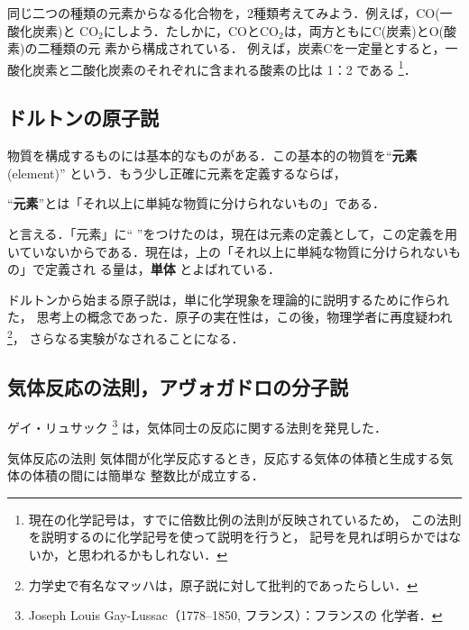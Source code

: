             同じ二つの種類の元素からなる化合物を，2種類考えてみよう．例えば，CO(一酸化炭素)と
            CO${}_{2}$にしよう．たしかに，COとCO${}_{2}$は，両方ともにC(炭素)とO(酸素)の二種類の元
            素から構成されている．
            例えば，炭素Cを一定量とすると，一酸化炭素と二酸化炭素のそれぞれに含まれる酸素の比は 1：2 である
                \footnote{
                    現在の化学記号は，すでに倍数比例の法則が反映されているため，
                    この法則を説明するのに化学記号を使って説明を行うと，
                    記号を見れば明らかではないか，と思われるかもしれない．
                }．

        \subsection{ドルトンの原子説}
            物質を構成するものには基本的なものがある．この基本的の物質を“\textbf{元素}(element)”
            という．もう少し正確に元素を定義するならば，
                \begin{center}
                    “\textbf{元素}”とは「それ以上に単純な物質に分けられないもの」である．
                \end{center}
            と言える．「元素」に“ ”をつけたのは，現在は元素の定義として，この定義を用
            いていないからである．現在は，上の「それ以上に単純な物質に分けられないもの」で定義され
            る量は，\textbf{単体} とよばれている．

            ドルトンから始まる原子説は，単に化学現象を理論的に説明するために作られた，
            思考上の概念であった．原子の実在性は，この後，物理学者に再度疑われ
                \footnote{
                    力学史で有名なマッハは，原子説に対して批判的であったらしい．
                }，
            さらなる実験がなされることになる．

        \subsection{気体反応の法則，アヴォガドロの分子説}
            ゲイ・リュサック
                \footnote{
                    Joseph Louis Gay-Lussac（1778--1850, フランス）：フランスの
                    化学者．
                }
            は，気体同士の反応に関する法則を発見した．
            \begin{myshadebox}{気体反応の法則}
                気体間が化学反応するとき，反応する気体の体積と生成する気体の体積の間には簡単な
                整数比が成立する．
            \end{myshadebox}

